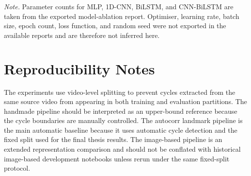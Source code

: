 \begin{table}[htbp]
\vspace{0.5em}
\footnotesize
\noindent\textit{Note.} Parameter counts for MLP, 1D-CNN, BiLSTM, and
CNN-BiLSTM are taken from the exported model-ablation report. Optimiser,
learning rate, batch size, epoch count, loss function, and random seed were not
exported in the available reports and are therefore not inferred here.
\end{table}

\section{Reproducibility Notes}
\label{app:reproducibility-notes}

The experiments use video-level splitting to prevent cycles extracted from the
same source video from appearing in both training and evaluation partitions.
The handmade pipeline should be interpreted as an upper-bound reference because
the cycle boundaries are manually controlled. The autocorr landmark pipeline is
the main automatic baseline because it uses automatic cycle detection and the
fixed split used for the final thesis results. The image-based pipeline is an
extended representation comparison and should not be conflated with historical
image-based development notebooks unless rerun under the same fixed-split
protocol.

